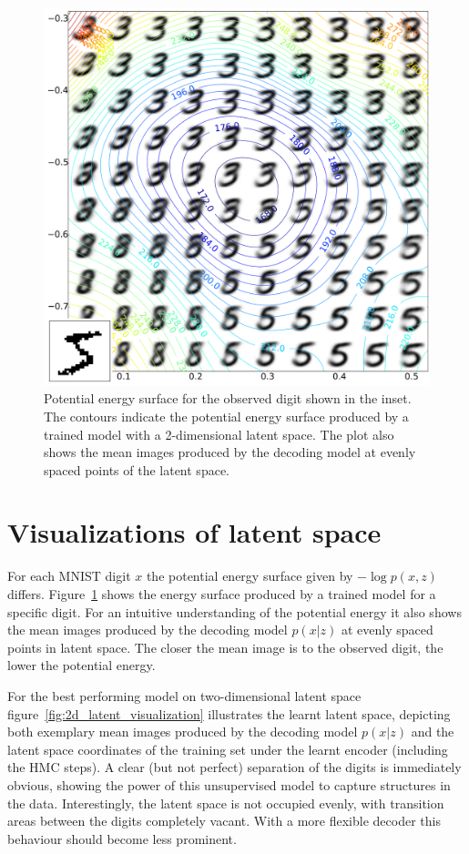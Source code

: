 \begin{appendices}
\begin{figure}[hb]
\centering
\includegraphics[width=\columnwidth]{figures/vae_pot_energy_example_with_inset.pdf}
\caption{Potential energy surface for the observed digit shown in the inset. The contours indicate the potential energy surface produced by a trained model with a 2-dimensional latent space. The plot also shows the mean images produced by the decoding model at evenly spaced points of the latent space.}
\label{fig:EnergySurfaceMNIST}
\end{figure}

\section{Visualizations of latent space}
\label{app:LatentVisualizations}

For each MNIST digit $x$ the potential energy surface given by $-\log p(x, z)$ differs. Figure~\ref{fig:EnergySurfaceMNIST} shows the energy surface produced by a trained model for a specific digit. For an intuitive understanding of the potential energy it also shows the mean images produced by the decoding model $p(x|z)$ at evenly spaced points in latent space. The closer the mean image is to the observed digit, the lower the potential energy.

For the best performing model on two-dimensional latent space figure~\ref{fig:2d_latent_visualization} illustrates the learnt latent space, depicting both exemplary mean images produced by the decoding model $p(x|z)$ and the latent space coordinates of the training set under the learnt encoder (including the HMC steps). A clear (but not perfect) separation of the digits is immediately obvious, showing the power of this unsupervised model to capture structures in the data. Interestingly, the latent space is not occupied evenly, with transition areas between the digits completely vacant. With a more flexible decoder this behaviour should become less prominent.


\end{appendices}
